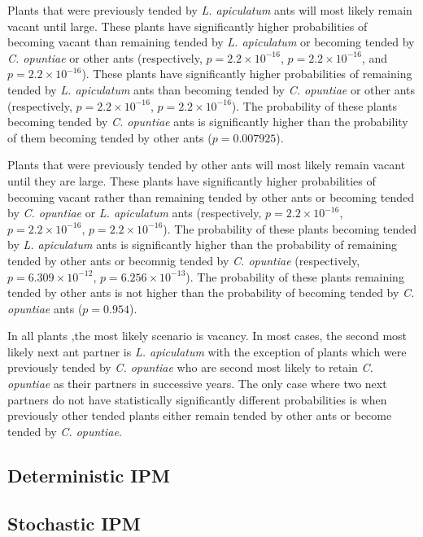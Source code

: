 \documentclass[11pt]{article}
\begin{document}
Plants that were previously tended by \textit{L. apiculatum} ants will most likely remain vacant until large. 
These plants have significantly higher probabilities of becoming vacant than remaining tended by \textit{L. apiculatum} or becoming tended by \textit{C. opuntiae} or other ants (respectively, $p = 2.2 \times 10^{-16}$, $p = 2.2 \times 10^{-16}$, and $p = 2.2 \times 10^{-16}$).
These plants have significantly higher probabilities of remaining tended by \textit{L. apiculatum} ants than becoming tended by  \textit{C. opuntiae} or other ants (respectively, $p = 2.2 \times 10^{-16}$, $p = 2.2 \times 10^{-16}$).
The probability of these plants becoming tended by \textit{C. opuntiae} ants is significantly higher than the probability of them becoming tended by other ants ($p = 0.007925$).

Plants that were previously tended by other ants will most likely remain vacant until they are large. 
These plants have significantly higher probabilities of becoming vacant rather than remaining tended by other ants or becoming tended by \textit{C. opuntiae} or \textit{L. apiculatum} ants (respectively, $p = 2.2 \times 10^{-16}$, $p = 2.2 \times 10^{-16}$, $p = 2.2 \times 10^{-16}$).
The probability of these plants becoming tended by \textit{L. apiculatum} ants is significantly higher than the probability of remaining tended by other ants or becomnig tended by \textit{C. opuntiae} (respectively, $p = 6.309 \times 10^{-12}$, $p = 6.256 \times 10^{-13}$).
The probability of these plants remaining tended by other ants is not higher than the probability of becoming tended by \textit{C. opuntiae} ants ($p = 0.954$). 

In all plants ,the most likely scenario is vacancy.
In most cases, the second most likely next ant partner is \textit{L. apiculatum} with the exception of plants which were previously tended by \textit{C. opuntiae} who are second most likely to retain \textit{C. opuntiae} as their partners in successive years.
The only case where two next partners do not have statistically significantly different probabilities is when previously other tended plants either remain tended by other ants or become tended by \textit{C. opuntiae}. 

\subsection*{Deterministic IPM}

\subsection*{Stochastic IPM}
\end{document}
